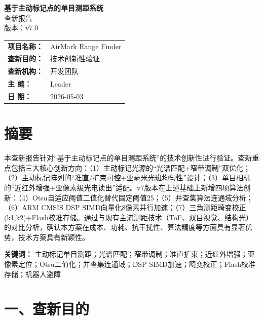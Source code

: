 \documentclass[12pt,a4paper]{article}
\begin{document}
\begin{titlepage}
\vspace*{2cm}
\begin{center}
{\fontsize{28pt}{\baselineskip}\selectfont\bfseries 基于主动标记点的单目测距系统}\\[1.5cm]
{\fontsize{18pt}{\baselineskip}\selectfont 查新报告}\\[0.5cm]
{\fontsize{14pt}{\baselineskip}\selectfont 版本：v7.0}\\[3cm]
\end{center}
\begin{tabular}{ll}
{\bfseries 项目名称：} & AirMark Range Finder \\[0.5cm]
{\bfseries 查新目的：} & 技术创新性验证 \\[0.5cm]
{\bfseries 查新机构：} & 开发团队 \\[0.5cm]
{\bfseries 主    编：} & Leader \\[0.5cm]
{\bfseries 日    期：} & 2026-05-03 \\
\end{tabular}
\end{titlepage}
\thispagestyle{empty}
\newpage

\section*{摘要}
本查新报告针对``基于主动标记点的单目测距系统''的技术创新性进行验证。查新重点包括三大核心创新方向：（1）主动标记光源的``光谱匹配+窄带调制''双优化；（2）主动标记阵列的``准直/扩束可控+亚毫米光斑均匀性''设计；（3）单目相机的``近红外增强+亚像素级光电读出''适配。v7版本在上述基础上新增四项算法创新：（4）Otsu自适应阈值二值化替代固定阈值25；（5）并查集算法连通域分析；（6）ARM CMSIS DSP SIMD向量化8像素并行加速；（7）三角测距畸变校正(k1,k2)+Flash校准存储。通过与现有主流测距技术（ToF、双目视觉、结构光）的对比分析，确认本方案在成本、功耗、抗干扰性、算法精度等方面具有显著优势，技术方案具有新颖性。

\textbf{关键词：} 主动标记单目测距；光谱匹配；窄带调制；准直扩束；近红外增强；亚像素定位；Otsu二值化；并查集连通域；DSP SIMD加速；畸变校正；Flash校准存储；机器人避障

\newpage

\section{一、查新目的}
\end{document}
